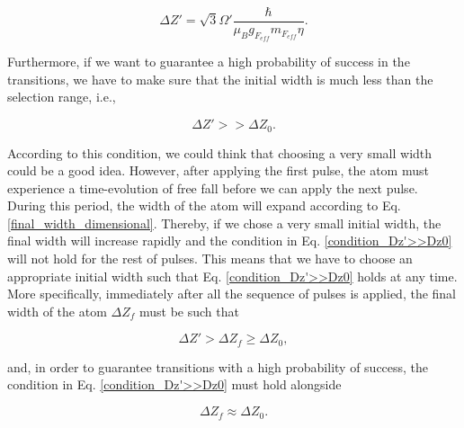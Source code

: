 \documentclass{article}
\begin{document}
\begin{equation}\label{maximum_width_rabi_frequency}
    \Delta Z' = \sqrt{3} \Omega' \frac{\hbar}{\mu_{B} g_{F_{eff}} m_{F_{eff}} \eta}.
\end{equation}

Furthermore, if we want to guarantee a high probability of success in the transitions, we have to make sure that the initial width is much less than the selection range, i.e.,

\begin{equation}\label{condition_Dz'>>Dz0}
    \Delta Z' >> \Delta Z_{0}.
\end{equation}

According to this condition, we could think that choosing a very small width could be a good idea. However, after applying the first pulse, the atom must experience a time-evolution of free fall before we can apply the next pulse. During this period, the width of the atom will expand according to Eq. \ref{final_width_dimensional}. Thereby, if we chose a very small initial width, the final width will increase rapidly and the condition in Eq. \ref{condition_Dz'>>Dz0} will not hold for the rest of pulses. This means that we have to choose an appropriate initial width such that Eq. \ref{condition_Dz'>>Dz0} holds at any time. More specifically, immediately after all the sequence of pulses is applied, the final width of the atom $\Delta Z_{f}$ must be such that

\begin{equation}\label{condition_transition_width1}
    \Delta Z' > \Delta Z_{f} \ge \Delta Z_{0},
\end{equation}

and, in order to guarantee transitions with a high probability of success, the condition in Eq. \ref{condition_Dz'>>Dz0} must hold alongside

\begin{equation}\label{condition_transition_width2}
    \Delta Z_{f} \approx \Delta Z_{0}.
\end{equation}
\end{document}
